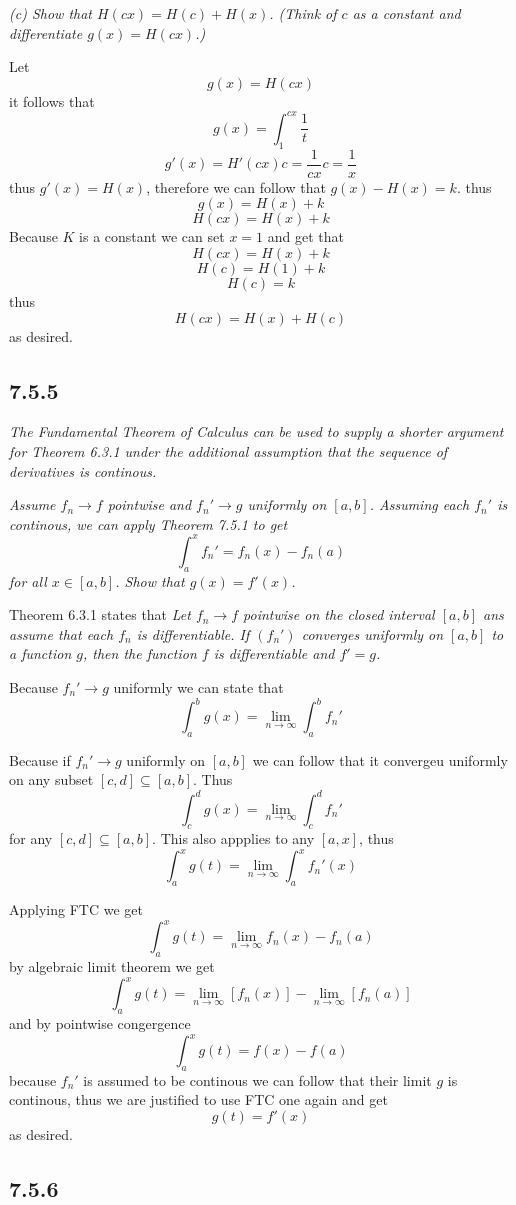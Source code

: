 \documentclass[11pt,oneside,titlepage]{book}
\begin{document}
\textit{(c) Show that $H(cx) = H(c) + H(x)$. (Think of $c$ as a constant and
  differentiate $g(x) = H(cx)$.)}

Let
$$g(x) = H(cx)$$
it follows that
$$g(x) = \int_1^{cx}{\frac{1}{t}}$$
$$g'(x) = H'(cx)c = \frac{1}{cx} c = \frac{1}{x}$$
thus $g'(x) = H(x)$, therefore we can follow that $g(x) - H(x) = k$.
thus
$$g(x) = H(x) + k$$
$$H(cx) = H(x) + k$$
Because $K$ is a constant we can set $x = 1$ and get that 
$$H(cx) = H(x) + k$$
$$H(c) = H(1) + k$$
$$H(c) =  k$$
thus
$$H(cx) = H(x) + H(c)$$
as desired.

\subsection*{7.5.5}
\textit{The Fundamental Theorem of Calculus can be used to supply a shorter
  argument for Theorem 6.3.1 under the additional assumption that the sequence
  of derivatives is continous.}

\textit{Assume $f_n \to f$ pointwise and $f_n' \to g$ uniformly on $[a, b]$.
  Assuming each $f_n'$ is continous, we can apply Theorem 7.5.1 to get}
$$\int_a^x{f_n'} = f_n(x) - f_n(a)$$
\textit{for all $x \in [a, b]$. Show that $g(x) = f'(x)$.}

Theorem 6.3.1 states that
\textit{Let $f_n \to f$ pointwise on the closed interval $[a, b]$ ans assume
  that each $f_n$ is differentiable. If $(f_n')$ converges uniformly on
  $[a, b]$ to a function $g$, then the function $f$ is differentiable and
  $f' = g$.}

Because $f_n' \to g$ uniformly we can state that
$$\int_a^b{g(x)} = \lim_{n \to \infty}{\int_a^b{f_n'}}$$

Because if $f_n' \to g$ uniformly on $[a, b]$ we can follow that
it convergeu uniformly on any subset $[c, d] \subseteq [a, b]$. Thus
$$\int_c^d{g(x)} = \lim_{n \to \infty}{\int_c^d{f_n'}}$$
for any $[c, d] \subseteq [a, b]$. This also appplies to any $[a, x]$, thus
$$\int_a^x{g(t)} = \lim_{n \to \infty}{\int_a^x{f_n'(x)}}$$

Applying FTC we get
$$\int_a^x{g(t)} = \lim_{n \to \infty}{f_n(x) - f_n(a)}$$
by algebraic limit theorem we get
$$\int_a^x{g(t)} = \lim_{n \to \infty}{[f_n(x)]}
- \lim_{n \to \infty}{[f_n(a)]}$$
and by pointwise congergence
$$\int_a^x{g(t)}= f(x) - f(a)$$
because $f_n'$ is assumed to be continous we can follow that their limit $g$
is continous, thus we are justified to use FTC one again and get 
$$g(t)= f'(x)$$
as desired.

\subsection*{7.5.6}
\end{document}
